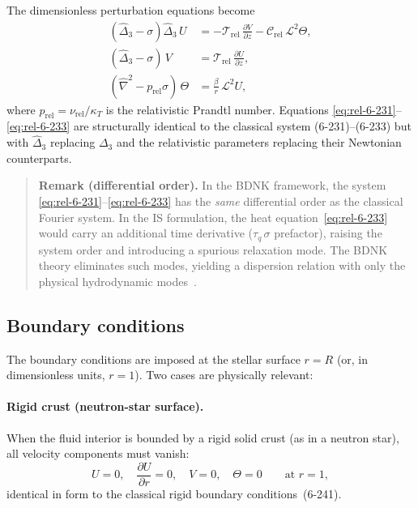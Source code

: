 The dimensionless perturbation equations become
\begin{align}
  (\hat{\Delta}_{3}-\sigma)\hat{\Delta}_{3}\,U
  &= -\mathscr{T}_{\mathrm{rel}}\,
     \frac{\partial V}{\partial z}
     - \mathcal{C}_{\mathrm{rel}}\,\mathscr{L}^{2}\Theta,
  \label{eq:rel-6-231}\\[4pt]
  (\hat{\Delta}_{3}-\sigma)\,V
  &= \mathscr{T}_{\mathrm{rel}}\,
     \frac{\partial U}{\partial z},
  \label{eq:rel-6-232}\\[4pt]
  (\hat{\nabla}^{2}-p_{\mathrm{rel}}\sigma)\,\Theta
  &= \frac{\beta}{r}\,\mathscr{L}^{2}U,
  \label{eq:rel-6-233}
\end{align}
where $p_{\mathrm{rel}} = \nu_{\mathrm{rel}}/\kappa_{T}$ is the
relativistic Prandtl number.  Equations
\eqref{eq:rel-6-231}--\eqref{eq:rel-6-233} are structurally
identical to the classical system (6-231)--(6-233) but with
$\hat{\Delta}_{3}$ replacing $\Delta_{3}$ and the relativistic
parameters replacing their Newtonian counterparts.

\begin{quote}
\textbf{Remark (differential order).}
In the BDNK framework, the system
\eqref{eq:rel-6-231}--\eqref{eq:rel-6-233} has the \emph{same}
differential order as the classical Fourier system.  In the IS
formulation, the heat equation~\eqref{eq:rel-6-233} would carry an
additional time derivative ($\tau_{q}\,\sigma$ prefactor), raising
the system order and introducing a spurious relaxation mode.  The
BDNK theory eliminates such modes, yielding a dispersion relation
with only the physical hydrodynamic
modes~\cite{Kovtun2019,HoultKovtun2020}.
\end{quote}

\subsection{Boundary conditions}\label{sec:rel-61c}

The boundary conditions are imposed at the stellar surface $r = R$
(or, in dimensionless units, $r = 1$).  Two cases are physically
relevant:

\paragraph{Rigid crust (neutron-star surface).}
When the fluid interior is bounded by a rigid solid crust (as in a
neutron star), all velocity components must vanish:
\begin{equation}\label{eq:rel-6-241}
  U = 0,\quad
  \frac{\partial U}{\partial r} = 0,\quad
  V = 0,\quad
  \Theta = 0
  \qquad\text{at } r = 1,
\end{equation}
identical in form to the classical rigid boundary
conditions~(6-241).

